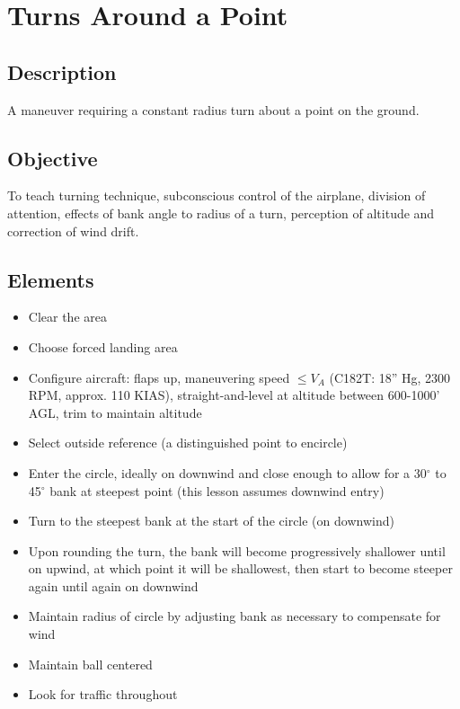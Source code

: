 \section{Turns Around a Point}

\subsection{Description}

A maneuver requiring a constant radius turn about a point on the ground.

\subsection{Objective}

To teach turning technique, subconscious control of the airplane, division of
attention, effects of bank angle to radius of a turn, perception of altitude
and correction of wind drift.

\subsection{Elements}

\begin{itemize}
  \item Clear the area
  \item Choose forced landing area
  \item Configure aircraft: flaps up, maneuvering speed $\leq V_A$
    (C182T: 18'' Hg, 2300 RPM, approx. 110 KIAS), straight-and-level at
    altitude between 600-1000' AGL, trim to maintain altitude
  \item Select outside reference (a distinguished point to encircle)
  \item Enter the circle, ideally on downwind and close enough to allow for a
    30$^\circ$ to 45$^\circ$ bank at steepest point (this lesson assumes
    downwind entry)
  \item Turn to the steepest bank at the start of the circle (on downwind)
  \item Upon rounding the turn, the bank will become progressively shallower
    until on upwind, at which point it will be shallowest, then start to become
    steeper again until again on downwind
  \item Maintain radius of circle by adjusting bank as necessary to compensate
    for wind
  \item Maintain ball centered
  \item Look for traffic throughout
\end{itemize}

